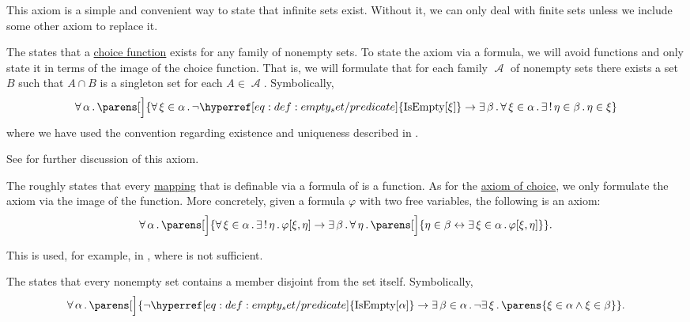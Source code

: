 \begin{definition}
\begin{thmenum}
    This axiom is a simple and convenient way to state that infinite sets exist. Without it, we can only deal with finite sets unless we include some other axiom to replace it.

     The  states that a \hyperref[def:choice_function]{choice function} exists for any family of nonempty sets. To state the axiom via a formula, we will avoid functions and only state it in terms of the image of the choice function. That is, we will formulate that for each family \( \mscrA \) of nonempty sets there exists a set \( B \) such that \( A \cap B \) is a singleton set for each \( A \in \mscrA \). Symbolically,
    \begin{equation}\label{eq:def:zfc/choice}
      \qforall \alpha \parens[\Big]
        {
          \qforall {\xi \in \alpha} \neg \hyperref[eq:def:empty_set/predicate]{\op{IsEmpty}[\xi]}
          \rightarrow
          \qexists \beta \qforall {\xi \in \alpha} \qExists {\eta \in \beta} \eta \in \xi
        }
    \end{equation}
    where we have used the convention regarding existence and uniqueness described in .

    See  for further discussion of this axiom.

     The  roughly states that every \hyperref[rem:function_definition]{mapping} that is definable via a formula of  is a function. As for the \hyperref[def:zfc/choice]{axiom of choice}, we only formulate the axiom via the image of the function. More concretely, given a formula \( \varphi \) with two free variables, the following is an axiom:
    \begin{equation}\label{eq:def:zfc/replacement}
      \qforall \alpha \parens[\Big]
        {
          \qforall {\xi \in \alpha} \qExists \eta \varphi[\xi, \eta]
          \rightarrow
          \qexists \beta \qforall \eta \parens[\Big]{ \eta \in \beta \leftrightarrow \qexists {\xi \in \alpha} \varphi[\xi, \eta] }
        }.
    \end{equation}

    This is used, for example, in , where  is not sufficient.

     The  states that every nonempty set contains a member disjoint from the set itself. Symbolically,
    \begin{equation}\label{eq:def:zfc/foundation}
      \qforall \alpha \parens[\Big]
        {
          \neg \hyperref[eq:def:empty_set/predicate]{\op{IsEmpty}[\alpha]}
          \rightarrow
          \qexists {\beta \in \alpha} \neg \qexists \xi \parens{ \xi \in \alpha \wedge \xi \in \beta }
        }.
    \end{equation}
  \end{thmenum}
\end{definition}

